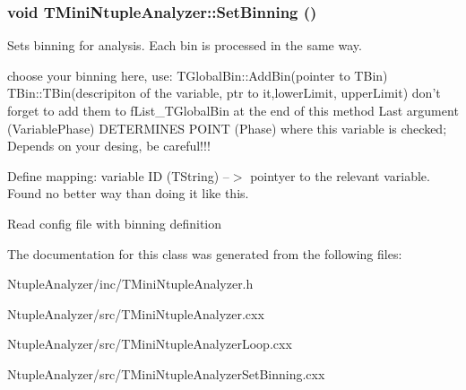 \subsubsection{\setlength{\rightskip}{0pt plus 5cm}void TMini\-Ntuple\-Analyzer::Set\-Binning ()\hspace{0.3cm}{\tt  [private]}}\label{classTMiniNtupleAnalyzer_00af1592754549584f500cb9a6ace31e}


Sets binning for analysis. Each bin is processed in the same way. 

choose your binning here, use: TGlobal\-Bin::Add\-Bin(pointer to TBin) TBin::TBin(descripiton of the variable, ptr to it,lower\-Limit, upper\-Limit) don't forget to add them to f\-List\_\-TGlobal\-Bin at the end of this method Last argument (Variable\-Phase) DETERMINES POINT (Phase) where this variable is checked; Depends on your desing, be careful!!!

Define mapping: variable ID (TString) --$>$ pointyer to the relevant variable. Found no better way than doing it like this.

Read config file with binning definition 

The documentation for this class was generated from the following files:\begin{CompactItemize}
\item 
Ntuple\-Analyzer/inc/TMini\-Ntuple\-Analyzer.h\item 
Ntuple\-Analyzer/src/TMini\-Ntuple\-Analyzer.cxx\item 
Ntuple\-Analyzer/src/TMini\-Ntuple\-Analyzer\-Loop.cxx\item 
Ntuple\-Analyzer/src/TMini\-Ntuple\-Analyzer\-Set\-Binning.cxx\end{CompactItemize}
